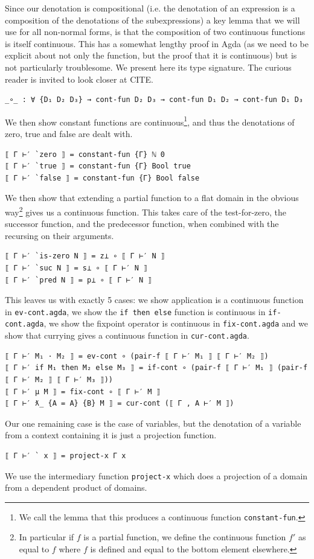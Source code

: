 \documentclass[12pt,a4paper,twoside,openright]{report}
\begin{document}
Since our denotation is compositional (i.e. the denotation of an expression is a composition of the denotations of the subexpressions) a key lemma that we will use for all non-normal forms, is that the composition of two continuous functions is itself continuous. This has a somewhat lengthy proof in Agda (as we need to be explicit about not only the function, but the proof that it is continuous) but is not particularly troublesome. We present here its type signature. The curious reader is invited to look closer at CITE.
\begin{verbatim}
_∘_ : ∀ {D₁ D₂ D₃} → cont-fun D₂ D₃ → cont-fun D₁ D₂ → cont-fun D₁ D₃
\end{verbatim}

We then show constant functions are continuous\footnote{We call the lemma that this produces a continuous function \texttt{constant-fun}.}, and thus the denotations of zero, true and false are dealt with. 
\begin{verbatim}
⟦ Γ ⊢′ `zero ⟧ = constant-fun {Γ} ℕ 0
⟦ Γ ⊢′ `true ⟧ = constant-fun {Γ} Bool true
⟦ Γ ⊢′ `false ⟧ = constant-fun {Γ} Bool false
\end{verbatim}
We then show that extending a partial function to a flat domain in the obvious way\footnote{In particular if $f$ is a partial function, we define the continuous function $f'$ as equal to $f$ where $f$ is defined and equal to the bottom element elsewhere.} gives us a continuous function. This takes care of the test-for-zero, the successor function, and the predecessor function, when combined with the recursing on their arguments. 
\begin{verbatim}
⟦ Γ ⊢′ `is-zero N ⟧ = z⊥ ∘ ⟦ Γ ⊢′ N ⟧
⟦ Γ ⊢′ `suc N ⟧ = s⊥ ∘ ⟦ Γ ⊢′ N ⟧
⟦ Γ ⊢′ `pred N ⟧ = p⊥ ∘ ⟦ Γ ⊢′ N ⟧
\end{verbatim}
This leaves us with exactly 5 cases: we show application is a continuous function in \texttt{ev-cont.agda}, we show the \texttt{if then else} function is continuous in \texttt{if-cont.agda}, we show the fixpoint operator is continuous in \texttt{fix-cont.agda} and we show that currying gives a continuous function in \texttt{cur-cont.agda}.
\begin{verbatim}
⟦ Γ ⊢′ M₁ · M₂ ⟧ = ev-cont ∘ (pair-f ⟦ Γ ⊢′ M₁ ⟧ ⟦ Γ ⊢′ M₂ ⟧) 
⟦ Γ ⊢′ if M₁ then M₂ else M₃ ⟧ = if-cont ∘ (pair-f ⟦ Γ ⊢′ M₁ ⟧ (pair-f ⟦ Γ ⊢′ M₂ ⟧ ⟦ Γ ⊢′ M₃ ⟧))
⟦ Γ ⊢′ μ M ⟧ = fix-cont ∘ ⟦ Γ ⊢′ M ⟧ 
⟦ Γ ⊢′ ƛ_ {A = A} {B} M ⟧ = cur-cont (⟦ Γ , A ⊢′ M ⟧)
\end{verbatim}
Our one remaining case is the case of variables, but the denotation of a variable from a context containing it is just a projection function. 
\begin{verbatim}
⟦ Γ ⊢′ ` x ⟧ = project-x Γ x
\end{verbatim}
We use the intermediary function \texttt{project-x} which does a projection of a domain from a dependent product of domains.
\end{document}
